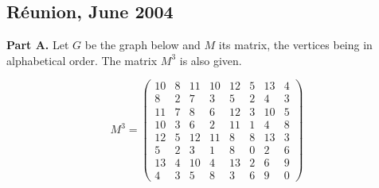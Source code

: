 \begin{tkzexample}
\end{tkzexample}

\newpage
\subsection{Réunion, June 2004}\label{larj04}
\textbf{Part A.} Let $G$ be the graph below and $M$ its matrix, the vertices
being in alphabetical order. The matrix $M^3$ is also given.

\begin{center}
\end{center}

\[M^3 =
\begin{pmatrix}
10 & 8 & 11 & 10 & 12 & 5 & 13 & 4\\
 8 & 2 &  7 &  3 &  5 & 2 &  4 & 3\\
11 & 7 &  8 &  6 & 12 & 3 & 10 & 5\\
10 & 3 &  6 &  2 & 11 & 1 &  4 & 8\\
12 & 5 & 12 & 11 &  8 & 8 & 13 & 3\\
 5 & 2 &  3 &  1 &  8 & 0 &  2 & 6\\
13 & 4 & 10 &  4 & 13 & 2 &  6 & 9\\
 4 & 3 &  5 &  8 &  3 & 6 &  9 & 0
\end{pmatrix}\]

